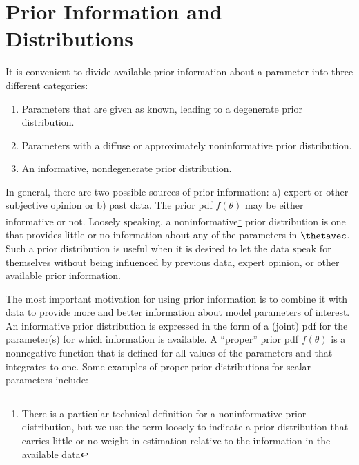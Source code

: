 \section{Prior Information and Distributions}
\label{section:prior.dist}

It is convenient to divide available prior information 
about a parameter into
three
different categories:
\begin{enumerate}
\item
Parameters that are given as known, leading to a degenerate prior distribution.
\item
Parameters with a diffuse or approximately noninformative prior distribution.
\item
An informative, nondegenerate prior distribution.
\end{enumerate}

In general, there are two possible sources of prior information:
a) expert or other subjective opinion or b) past data.  The prior
pdf $f(\theta)$ may be either informative or not.  Loosely
speaking, a noninformative\footnote{There is a particular technical
definition for a noninformative prior distribution, but we use the
term loosely to indicate a prior distribution that carries little or
no weight in estimation relative to the information in the available
data} prior distribution is one that provides little or no information
about any of the parameters in $\thetavec$.  Such a prior distribution
is useful when it is desired to let the data speak for themselves
without being influenced by previous data, expert opinion, or other
available prior information.

The most important motivation for using prior information is to
combine it with data to provide more and better information about
model parameters of interest.  An informative prior distribution is
expressed in the form of a (joint) pdf for the parameter(s) for
which information is available.  A ``proper'' prior pdf $f(\theta)$
is a nonnegative function that is defined for all values of the
parameters and that integrates to one.  Some examples of proper
prior distributions for scalar parameters include:

